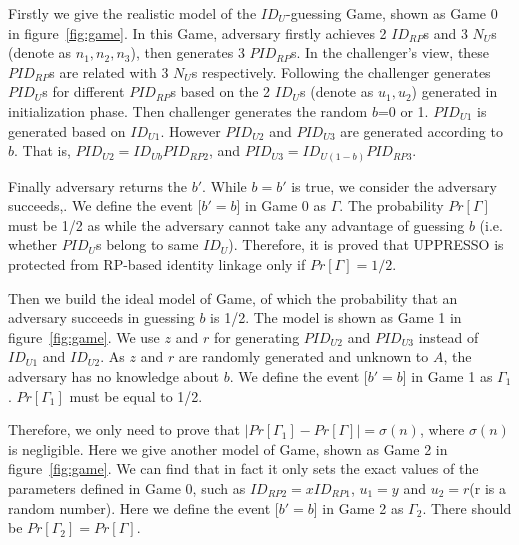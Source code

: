 Firstly we give the realistic model of the $ID_U$-guessing Game, shown as Game 0 in figure~\ref{fig:game}. In this Game, adversary firstly achieves 2 $ID_{RP}$s and 3 $N_U$s (denote as $n_1, n_2, n_3$), then generates 3 $PID_{RP}$s. In the challenger's view, these $PID_{RP}$s are related with 3 $N_U$s respectively. Following the challenger generates $PID_U$s for different $PID_{RP}$s based on the 2 $ID_U$s (denote as $u_1, u_2$) generated in initialization phase. 
Then challenger generates the random $b$=0 or 1. $PID_{U1}$ is generated based on $ID_{U1}$. However $PID_{U2}$ and $PID_{U3}$ are generated according to $b$. That is, $PID_{U2}=ID_{Ub}PID_{RP2}$, and $PID_{U3}=ID_{U(1-b)}PID_{RP3}$.  


Finally adversary returns the $b'$. While $b=b'$ is true, we consider the adversary succeeds,.
We define the event [$b'=b$] in Game 0 as $\Gamma$. The probability $Pr[\Gamma]$ must be 1/2 as while the adversary cannot take any advantage of guessing $b$ (i.e.  whether $PID_U$s belong to same $ID_U$). Therefore, it is proved that UPPRESSO is protected from RP-based identity linkage only if $Pr[\Gamma]=1/2$.

Then we build the ideal model of Game, of which the probability  that an adversary succeeds in guessing $b$ is 1/2. The model is shown as Game 1 in figure~\ref{fig:game}. We use $z$ and $r$ for generating $PID_{U2}$ and $PID_{U3}$ instead of $ID_{U1}$ and $ID_{U2}$. As $z$ and $r$ are randomly generated and unknown to $A$, the adversary has no knowledge about $b$. We  define the event [$b'=b$] in Game 1 as $\Gamma_1$. $Pr[\Gamma_1]$ must be equal to 1/2. 

Therefore, we only need to prove that $|Pr[\Gamma_1]-Pr[\Gamma]|=\sigma(n)$, where $\sigma(n)$ is negligible. Here we give another model of Game, shown as Game 2 in figure~\ref{fig:game}. We can find that in fact it only sets the exact values of the parameters defined in Game 0, such as $ID_{RP2}=xID_{RP1}$, $u_1=y$ and $u_2=r$(r is a random number).  Here we define the event [$b'=b$] in Game 2 as $\Gamma_2$. There should be $Pr[\Gamma_2]=Pr[\Gamma]$.

